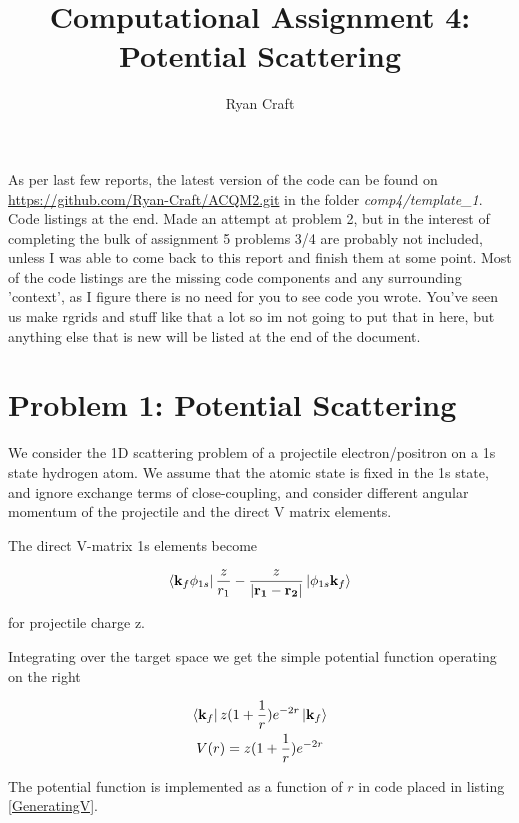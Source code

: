 \documentclass{article}
\renewcommand{\vec}[1]{\mathbf{#1}}
\begin{document}
	\noindent
	\title{Computational Assignment 4: Potential Scattering}
	\author{Ryan Craft}
    \maketitle 
    
    As per last few reports, the latest version of the code can be found on \url{https://github.com/Ryan-Craft/ACQM2.git} in the folder \textit{comp4/template\_1}. Code listings at the end.
    Made an attempt at problem 2, but in the interest of completing the bulk of assignment 5 problems 3/4 are probably not included, unless I was able to come back to this report and finish them at some point. Most of the code listings are the missing code components and any surrounding 'context', as I figure there is no need for you to see code you wrote. You've seen us make rgrids and stuff like that a lot so im not going to put that in here, but anything else that is new will be listed at the end of the document.
    
    \section{Problem 1: Potential Scattering}
    
    We consider the 1D scattering problem of a projectile electron/positron on a 1s state hydrogen atom. We assume that the atomic state is fixed in the 1s state, and ignore exchange terms of close-coupling, and consider different angular momentum of the projectile and the direct V matrix elements.
    
    The direct V-matrix 1s elements become
    
    \begin{gather}
   	\bra{\vec{k}_f \phi_{1s}}\frac{z}{r_1} - \frac{z}{|\vec{r_1} - \vec{r_2}|}\ket{\phi_{1s}\vec{k}_f}
   	\end{gather}
   	
   	for projectile charge z.
   	
   	Integrating over the target space we get the simple potential function operating on the right
   	
   	\begin{gather}
   		\bra{\vec{k}_f} z(1+ \frac{1}{r}) e^{-2r} \ket{\vec{k}_f}\\
   		V(r) = z(1+ \frac{1}{r}) e^{-2r}
   	\end{gather}
   	
   	The potential function is implemented as a function of $r$ in code placed in listing \ref{GeneratingV}.
   	
\end{document}
